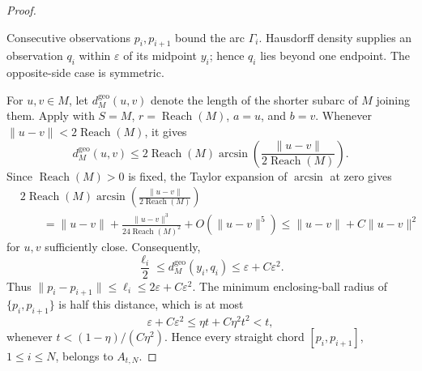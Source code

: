 \documentclass{article}
\newcommand{\Reach}{\operatorname{Reach}}
\numberwithin{equation}{section}
\newcommand{\eps}{\varepsilon}
\renewcommand{\epsilon}{\eps}
\begin{document}
\begin{proof}
\begin{center}
\par\smallskip
\begin{minipage}{0.88\linewidth}
\small
Consecutive observations $p_i,p_{i+1}$ bound the arc $\Gamma_i$.
Hausdorff density supplies an observation $q_i$ within $\epsilon$ of its
midpoint $y_i$; hence $q_i$ lies beyond one endpoint. The opposite-side case
is symmetric.
\end{minipage}
\end{center}


For $u,v\in M$, let $d_M^{\mathrm{geo}}(u,v)$ denote the length of the shorter subarc of $M$
joining them. Apply \citet[Lemma~3]{boissonnat2019reach} with
$S=M$, $r=\Reach(M)$, $a=u$, and $b=v$. Whenever
$\|u-v\|<2\Reach(M)$, it gives
\[
 d_M^{\mathrm{geo}}(u,v)
 \le 2\Reach(M)\arcsin\left(
 \frac{\|u-v\|}{2\Reach(M)}\right).
\]
Since $\Reach(M)>0$ is fixed, the Taylor expansion of $\arcsin$ at zero
gives
\[
 \begin{aligned}
 &2\Reach(M)\arcsin\left(
   \frac{\|u-v\|}{2\Reach(M)}\right)\\
 &\qquad=\|u-v\|
 +\frac{\|u-v\|^3}{24\Reach(M)^2}
 +O(\|u-v\|^5)
 \le\|u-v\|+C\|u-v\|^2
 \end{aligned}
\]
for $u,v$ sufficiently close. Consequently,
\[
 \frac{\ell_i}{2}
 \le d_M^{\mathrm{geo}}(y_i,q_i)
 \le\epsilon+C\epsilon^2.
\]
Thus
$\|p_i-p_{i+1}\|\le\ell_i\le2\epsilon+C\epsilon^2$. The minimum
enclosing-ball radius of $\{p_i,p_{i+1}\}$ is half this distance, which is
at most
\[
 \epsilon+C\epsilon^2
 \le\eta t+C\eta^2t^2<t,
\]
whenever
$t<(1-\eta)/(C\eta^2)$. Hence every straight
chord $[p_i,p_{i+1}]$, $1\le i\le N$, belongs to $A_{t,N}$.



\end{proof}
\end{document}
